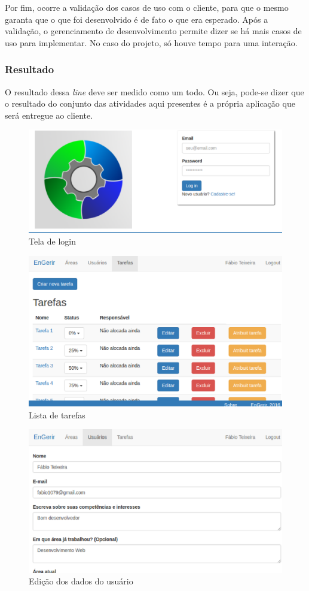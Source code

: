 Por fim, ocorre a validação dos casos de uso com o cliente, para que o mesmo garanta que o que foi desenvolvido é de fato o que era esperado. Após a validação, o gerenciamento de desenvolvimento permite dizer se há mais casos de uso para implementar. No caso do projeto, só houve tempo para uma interação.

\subsubsection{Resultado}

O resultado dessa \textit{line} deve ser medido como um todo. Ou seja, pode-se dizer que o resultado do conjunto das atividades aqui presentes é a própria aplicação que será entregue ao cliente.


\begin{figure}[!ht]
  \centering
  \label{user_login}
    \includegraphics[keepaspectratio=true,scale=0.6]{figuras/user-login.eps}
  \caption{Tela de login}
\end{figure}


\begin{figure}[!ht]
  \centering
  \label{task_list}
    \includegraphics[keepaspectratio=true,scale=0.6]{figuras/task-list.eps}
  \caption{Lista de tarefas}
\end{figure}


\begin{figure}[!ht]
  \centering
  \label{user_edit}
    \includegraphics[keepaspectratio=true,scale=0.6]{figuras/user-edit.eps}
  \caption{Edição dos dados do usuário}
\end{figure}
